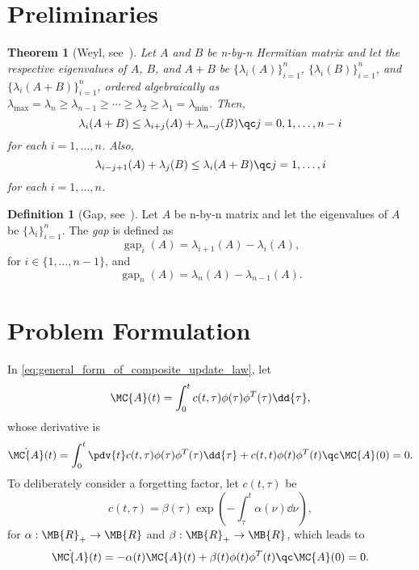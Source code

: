\documentclass[nobib]{my-handout}
\newtheorem{theorem}{Theorem}
\theoremstyle{definition}
\newtheorem{definition}{Definition}
\theoremstyle{remark}
\DeclareMathOperator{\gap}{gap}
\begin{document}
\section{Preliminaries}

\begin{theorem}[Weyl, see~\cite{horn_matrix_2012}]
	Let $A$ and $B$ be n-by-n Hermitian matrix and let the respective eigenvalues
	of $A$, $B$, and $A+B$ be $\{\lambda_i(A)\}_{i=1}^n$,
	$\{\lambda_i(B)\}_{i=1}^n$, and $\{\lambda_i(A+B)\}_{i=1}^n$, ordered
	algebraically as $\lambda_{\max} = \lambda_n \ge \lambda_{n-1} \ge \cdots \ge
	\lambda_2 \ge \lambda_1 = \lambda_{\min}$. Then,
	\begin{equation*}
		\lambda_i(A+B) \le \lambda_{i+j}(A) + \lambda_{n-j}(B)\qc j=0,1,\dotsc,n-i
	\end{equation*}
	for each $i=1,\dotsc,n$. Also,
	\begin{equation*}
		\lambda_{i-j+1}(A) + \lambda_j(B) \le \lambda_i(A+B)\qc j=1,\dotsc,i
	\end{equation*}
	for each $i=1,\dotsc,n$.
\end{theorem}

\begin{definition}[Gap, see~\cite{ipsen_refined_2009}]
	Let $A$ be n-by-n matrix and let the eigenvalues of $A$ be
	$\{\lambda_i\}_{i=1}^n$. The \textit{gap} is defined as 
	\begin{equation*}
		\gap_{i}(A) = \lambda_{i+1}(A) - \lambda_i(A),
	\end{equation*}
	for $i \in \{1, \dotsc, n-1\}$, and
	\begin{equation*}
		\gap_n(A) = \lambda_n(A) - \lambda_{n-1}(A).
	\end{equation*}
\end{definition}


\section{Problem Formulation}

In \eqref{eq:general_form_of_composite_update_law}, let
\begin{equation*}
	\MC{A}(t) = \int_0^t c(t, \tau) \phi(\tau) \phi^T(\tau) \dd{\tau},
\end{equation*}
whose derivative is
\begin{equation*}
	\dot{\MC{A}}(t) = \int_0^t \pdv{t} c(t, \tau) \phi(\tau) \phi^T(\tau)
	\dd{\tau} + c(t, t) \phi(t) \phi^T(t) \qc \MC{A}(0) = 0.
\end{equation*}
To deliberately consider a forgetting factor, let $c(t, \tau)$ be
\begin{equation*}
	c(t, \tau) = \beta(\tau) \exp(- \int_\tau^t \alpha(\nu) \dd{\nu}),
\end{equation*}
for $\alpha: \MB{R}_{+} \to \MB{R}$ and $\beta: \MB{R}_{+} \to \MB{R}$,
which leads to 
\begin{equation*}
	\dot{\MC{A}}(t) = - \alpha(t) \MC{A}(t) + \beta(t) \phi(t) \phi^T(t) \qc
	\MC{A}(0) = 0.
\end{equation*}
\end{document}
